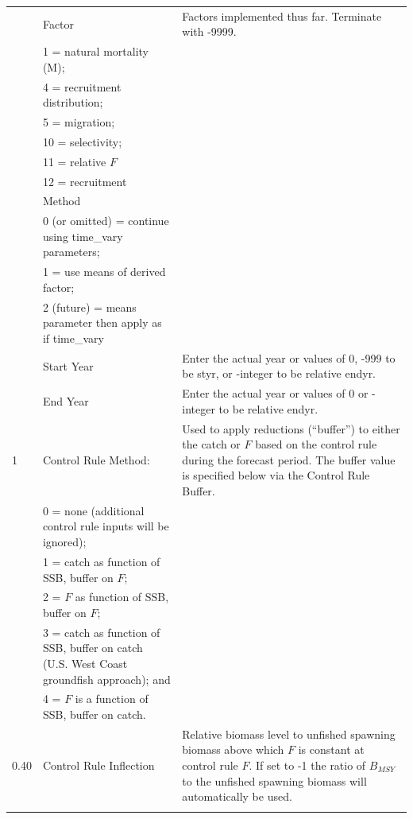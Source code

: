 \begin{landscape}
{\begin{longtable}{p{2cm} p{7cm} p{12cm}}
   & Factor & \multirow{1}{1cm}[-0.15cm]{\parbox{12cm}{Factors implemented thus far. Terminate with -9999.}} \\
   & 1 = natural mortality (M); & \\
   & 4 = recruitment distribution; & \\
   & 5 = migration; & \\
   & 10 = selectivity; & \\
   & 11 = relative $F$ & \\
   & 12 = recruitment & \\

   & Method & \Tstrut\\
   & 0 (or omitted) = continue using time\_vary parameters; & \\
   & 1 = use means of derived factor; & \\
   & 2 (future) = means parameter then apply as if time\_vary & \\
   & Start Year & Enter the actual year or values of 0, -999 to be styr, or -integer to be relative endyr. \\
   & End Year & Enter the actual year or values of 0 or -integer to be relative endyr. \\
  
  \hline
  1 & Control Rule Method: & \multirow{1}{1cm}[-0.15cm]{\parbox{12cm}{Used to apply reductions (``buffer'') to either the catch or $F$ based on the control rule during the forecast period. The buffer value is specified below via the Control Rule Buffer.}} \Tstrut\\
    & 0 = none (additional control rule inputs will be ignored); & \\
    & 1 = catch as function of SSB, buffer on $F$; & \\
    & 2 = $F$ as function of SSB, buffer on $F$; & \\
    & 3 = catch as function of SSB, buffer on catch (U.S. West Coast groundfish approach); and & \\
    & 4 = $F$ is a function of SSB, buffer on catch. & \Bstrut\\
  \hline

  0.40 \Tstrut & Control Rule Inflection & \multirow{1}{1cm}[-0.2cm]{\parbox{12cm}{Relative biomass level to unfished spawning biomass above which $F$ is constant at control rule $F$. If set to -1 the ratio of $B_{MSY}$ to the unfished spawning biomass will automatically be used.}} \Bstrut\\
    & & \Tstrut\Bstrut\\


\end{longtable}}
\end{landscape}
